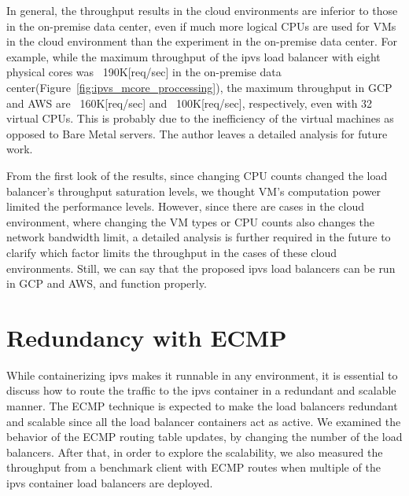 In general, the throughput results in the cloud environments are inferior to those in the on-premise data center, even if much more logical CPUs are used for VMs in the cloud environment than the experiment in the on-premise data center.
For example, while the maximum throughput of the ipvs load balancer with eight physical cores was ~190K[req/sec] in the on-premise data center(Figure~\ref{fig:ipvs_mcore_proccessing}), the maximum throughput in GCP and AWS are ~160K[req/sec] and ~100K[req/sec], respectively, even with 32 virtual CPUs.
This is probably due to the inefficiency of the virtual machines as opposed to Bare Metal servers.
The author leaves a detailed analysis for future work.

From the first look of the results, since changing CPU counts changed the load balancer's throughput saturation levels, we thought VM's computation power limited the performance levels.
However, since there are cases in the cloud environment, where changing the VM types or CPU counts also changes the network bandwidth limit, a detailed analysis is further required in the future to clarify which factor limits the throughput in the cases of these cloud environments.
Still, we can say that the proposed ipvs load balancers can be run in GCP and AWS, and function properly.

\FloatBarrier

\section{Redundancy with ECMP}

While containerizing ipvs makes it runnable in any environment, it is essential to discuss how to route the traffic to the ipvs container in a redundant and scalable manner.
The ECMP technique is expected to make the load balancers redundant and scalable since all the load balancer containers act as active.
We examined the behavior of the ECMP routing table updates, by changing the number of the load balancers.
After that, in order to explore the scalability, we also measured the throughput from a benchmark client with ECMP routes when multiple of the ipvs container load balancers are deployed.

